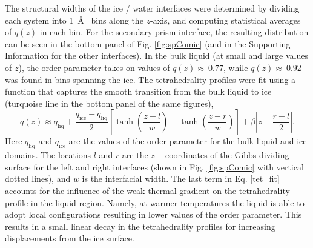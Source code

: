 The structural widths of the ice / water interfaces were determined by
dividing each system into 1~\AA~ bins along the $z$-axis, and
computing statistical averages of $q(z)$ in each bin. For the
secondary prism interface, the resulting distribution can be seen in
the bottom panel of Fig. \ref{fig:spComic} (and in the Supporting
Information for the other interfaces). In the bulk liquid (at small
and large values of $z$), the order parameter takes on values of
$q(z) \approx~0.77$, while $q(z) \approx~0.92$ was found in bins
spanning the ice. The tetrahedrality profiles were fit using a
function that captures the smooth transition from the bulk liquid to
ice (turquoise line in the bottom panel of the same figures),
\begin{equation}\label{tet_fit}
q(z) \approx
q_\mathrm{liq}+\frac{q_\mathrm{ice}-q_\mathrm{liq}}{2}\left[\tanh\left(\frac{z-l}{w}\right)-\tanh\left(\frac{z-r}{w}\right)\right]+\beta\left|z-\frac{r+l}{2}\right|.
\end{equation}
Here $q_\mathrm{liq}$ and $q_\mathrm{ice}$ are the values of the order
parameter for the bulk liquid and ice domains. The locations $l$ and
$r$ are the $z-$coordinates of the Gibbs dividing surface for the left
and right interfaces (shown in Fig. \ref{fig:spComic} with vertical
dotted lines), and $w$ is the interfacial width.  The last term in
Eq. \eqref{tet_fit} accounts for the influence of the weak thermal
gradient on the tetrahedrality profile in the liquid region. Namely,
at warmer temperatures the liquid is able to adopt local
configurations resulting in lower values of the order parameter. This
results in a small linear decay in the tetrahedrality profiles for
increasing displacements from the ice surface.

